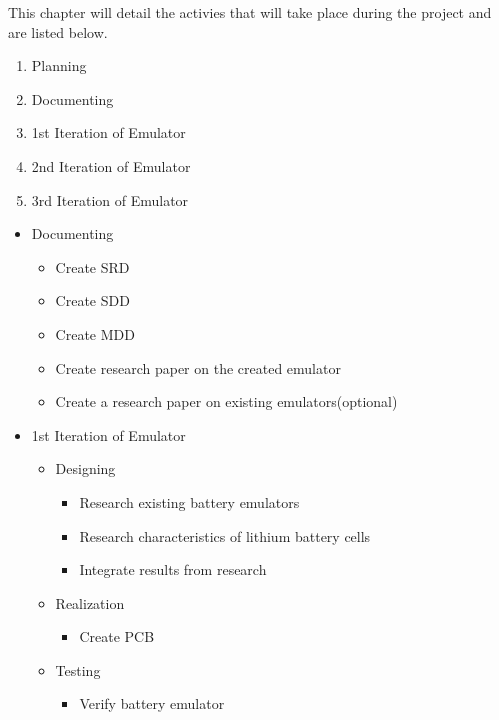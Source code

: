 This chapter will detail the activies that will take place during the project and are listed below. 

\begin{enumerate}
    \item Planning 
    \item Documenting
    \item 1st Iteration of Emulator
    \item 2nd Iteration of Emulator
    \item 3rd Iteration of Emulator
\end{enumerate}


\begin{itemize}
    \item Documenting
    \begin{itemize}
    \item Create SRD
    \item Create SDD
    \item Create MDD
    \item Create research paper on the created emulator 
    \item Create a research paper on existing emulators(optional)
    \end{itemize}

    \item 1st Iteration of Emulator
    \begin{itemize}
        \item Designing
        \begin{itemize}
            \item Research existing battery emulators 
            \item Research characteristics of lithium battery cells 
            \item Integrate results from research
        \end{itemize}
        \item Realization
        \begin{itemize}
            \item Create PCB
        \end{itemize}
        \item Testing
        \begin{itemize}
            \item Verify battery emulator
        \end{itemize}
    \end{itemize}


\end{itemize}
